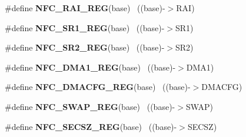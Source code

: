 \begin{DoxyCompactItemize}
\item 
\hypertarget{group___n_f_c___register___accessor___macros_gaa02ecd71a01174e610822ccb9a511cb6}{}\#define {\bfseries N\+F\+C\+\_\+\+R\+A\+I\+\_\+\+R\+E\+G}(base)                                            ~((base)-\/$>$R\+A\+I)\label{group___n_f_c___register___accessor___macros_gaa02ecd71a01174e610822ccb9a511cb6}

\item 
\hypertarget{group___n_f_c___register___accessor___macros_ga7e9533cd0f8c348f9b8f2b4d402d27c1}{}\#define {\bfseries N\+F\+C\+\_\+\+S\+R1\+\_\+\+R\+E\+G}(base)                                            ~((base)-\/$>$S\+R1)\label{group___n_f_c___register___accessor___macros_ga7e9533cd0f8c348f9b8f2b4d402d27c1}

\item 
\hypertarget{group___n_f_c___register___accessor___macros_gaf0740dda7a299ccb9e847d0c99a08825}{}\#define {\bfseries N\+F\+C\+\_\+\+S\+R2\+\_\+\+R\+E\+G}(base)                                            ~((base)-\/$>$S\+R2)\label{group___n_f_c___register___accessor___macros_gaf0740dda7a299ccb9e847d0c99a08825}

\item 
\hypertarget{group___n_f_c___register___accessor___macros_ga4fca824d22a10d67341920d829662331}{}\#define {\bfseries N\+F\+C\+\_\+\+D\+M\+A1\+\_\+\+R\+E\+G}(base)                                          ~((base)-\/$>$D\+M\+A1)\label{group___n_f_c___register___accessor___macros_ga4fca824d22a10d67341920d829662331}

\item 
\hypertarget{group___n_f_c___register___accessor___macros_ga26bea452a28f138143ad5903dd30cc7a}{}\#define {\bfseries N\+F\+C\+\_\+\+D\+M\+A\+C\+F\+G\+\_\+\+R\+E\+G}(base)                                      ~((base)-\/$>$D\+M\+A\+C\+F\+G)\label{group___n_f_c___register___accessor___macros_ga26bea452a28f138143ad5903dd30cc7a}

\item 
\hypertarget{group___n_f_c___register___accessor___macros_gaa1608a316c3331ec1cec5a59fad31126}{}\#define {\bfseries N\+F\+C\+\_\+\+S\+W\+A\+P\+\_\+\+R\+E\+G}(base)                                          ~((base)-\/$>$S\+W\+A\+P)\label{group___n_f_c___register___accessor___macros_gaa1608a316c3331ec1cec5a59fad31126}

\item 
\hypertarget{group___n_f_c___register___accessor___macros_gad9bb29810ea0cffc5fdc3ab7b24cfa89}{}\#define {\bfseries N\+F\+C\+\_\+\+S\+E\+C\+S\+Z\+\_\+\+R\+E\+G}(base)                                        ~((base)-\/$>$S\+E\+C\+S\+Z)\label{group___n_f_c___register___accessor___macros_gad9bb29810ea0cffc5fdc3ab7b24cfa89}


\end{DoxyCompactItemize}
